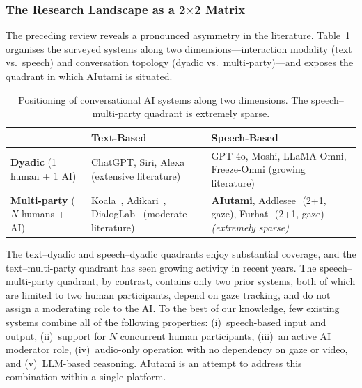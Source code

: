 \subsubsection{The Research Landscape as a 2$\times$2 Matrix}
\label{sssec:matrix}

The preceding review reveals a pronounced asymmetry in the literature.
Table~\ref{tab:positioning-matrix} organises the surveyed systems along two
dimensions---interaction modality (text vs.\ speech) and conversation topology
(dyadic vs.\ multi-party)---and exposes the quadrant in which AIutami is
situated.

\begin{table}[ht]
  \centering
  \caption{Positioning of conversational AI systems along two dimensions.  The
    speech--multi-party quadrant is extremely sparse.}
  \label{tab:positioning-matrix}
  \small
  \begin{tabularx}{\textwidth}{@{} l >{\raggedright\arraybackslash}X >{\raggedright\arraybackslash}X @{}}
    \toprule
    & \textbf{Text-Based} & \textbf{Speech-Based} \\
    \midrule
    \textbf{Dyadic} \newline (1 human + 1 AI)
      & ChatGPT, Siri, Alexa \newline (extensive literature)
      & GPT-4o, Moshi, LLaMA-Omni, Freeze-Omni \newline (growing literature) \\
    \addlinespace
    \textbf{Multi-party} \newline ($N$ humans + AI)
      & Koala~\cite{houde2025koala}, Adikari~\cite{adikari2022empathic},
        DialogLab~\cite{hu2025dialoglab} \newline (moderate literature)
      & \textbf{AIutami}, Addlesee~\cite{addlesee2024ari}\,(2+1, gaze),
        Furhat~\cite{axelsson2025furhat}\,(2+1, gaze) \newline
        \emph{(extremely sparse)} \\
    \bottomrule
  \end{tabularx}
\end{table}

The text--dyadic and speech--dyadic quadrants enjoy substantial coverage, and
the text--multi-party quadrant has seen growing activity in recent years.  The
speech--multi-party quadrant, by contrast, contains only two prior systems, both
of which are limited to two human participants, depend on gaze tracking, and do
not assign a moderating role to the AI.  To the best of our knowledge, few existing systems combine all of the
following properties: (i)~speech-based input and output, (ii)~support for
$N$ concurrent human participants, (iii)~an active AI moderator role,
(iv)~audio-only operation with no dependency on gaze or video, and
(v)~LLM-based reasoning.  AIutami is an attempt to address this
combination within a single platform.

